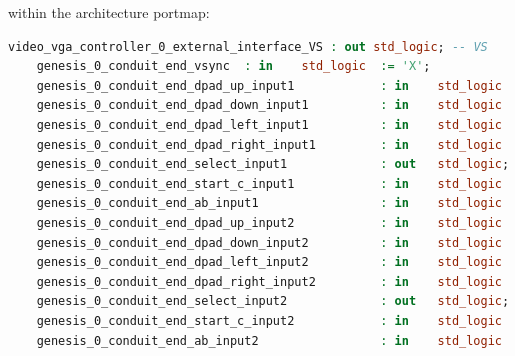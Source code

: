 \documentclass{capstonedoc}
\begin{document}
within the architecture portmap:

\begin{lstlisting}[language={vhdl},float]
	video_vga_controller_0_external_interface_VS : out std_logic; -- VS
	genesis_0_conduit_end_vsync  : in    std_logic  := 'X';             -- vsync
	genesis_0_conduit_end_dpad_up_input1            : in    std_logic  := 'X';             -- dpad_up_input1
	genesis_0_conduit_end_dpad_down_input1          : in    std_logic  := 'X';             -- dpad_down_input1
	genesis_0_conduit_end_dpad_left_input1          : in    std_logic  := 'X';             -- dpad_left_input1
	genesis_0_conduit_end_dpad_right_input1         : in    std_logic  := 'X';             -- dpad_right_input1
	genesis_0_conduit_end_select_input1             : out   std_logic;                     -- select_input1
	genesis_0_conduit_end_start_c_input1            : in    std_logic  := 'X';             -- start_c_input1
	genesis_0_conduit_end_ab_input1                 : in    std_logic  := 'X';             -- ab_input1
	genesis_0_conduit_end_dpad_up_input2            : in    std_logic  := 'X';             -- dpad_up_input2
	genesis_0_conduit_end_dpad_down_input2          : in    std_logic  := 'X';             -- dpad_down_input2
	genesis_0_conduit_end_dpad_left_input2          : in    std_logic  := 'X';             -- dpad_left_input2
	genesis_0_conduit_end_dpad_right_input2         : in    std_logic  := 'X';             -- dpad_right_input2
	genesis_0_conduit_end_select_input2             : out   std_logic;                     -- select_input2
	genesis_0_conduit_end_start_c_input2            : in    std_logic  := 'X';             -- start_c_input2
	genesis_0_conduit_end_ab_input2                 : in    std_logic  := 'X';             -- ab_input2
\end{lstlisting}
\end{document}

